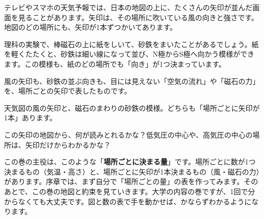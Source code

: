 
\noindent テレビやスマホの天気予報では、日本の地図の上に、たくさんの矢印が並んだ画面を見ることがあります。矢印は、その場所に吹いている風の向きと強さです。地図のどの場所にも、矢印が1本ずつかいてあります。

理科の実験で、棒磁石の上に紙をしいて、砂鉄をまいたことがあるでしょう。紙を軽くたたくと、砂鉄は細い線になって並び、N極からS極へ向かう模様ができます。この模様も、紙のどの場所でも「向き」が1つ決まっています。

\begin{bkfigure}
\label{bk:8-0:fig-kaze}
\end{bkfigure}

風の矢印も、砂鉄の並ぶ向きも、目には見えない「空気の流れ」や「磁石の力」を、場所ごとの矢印で表したものです。

\begin{hatena}
天気図の風の矢印と、磁石のまわりの砂鉄の模様。どちらも「場所ごとに矢印が1本」あります。\par\vspace{3pt}
この矢印の地図から、何が読みとれるかな？\enspace 低気圧の中心や、高気圧の中心の場所は、矢印だけからわかるかな？
\end{hatena}

この巻の主役は、このような「\textbf{場所ごとに決まる量}」です。場所ごとに数が1つ決まるもの（気温・高さ）と、場所ごとに矢印が1本決まるもの（風・磁石の力）があります。序章では、まず自分で「場所ごとの量」の表を作ってみます。そのあとで、この巻の地図と約束を見ていきます。大学の内容の巻ですが、1回で分からなくても大丈夫です。図と数の表で手を動かせば、かならずわかるようになります。

